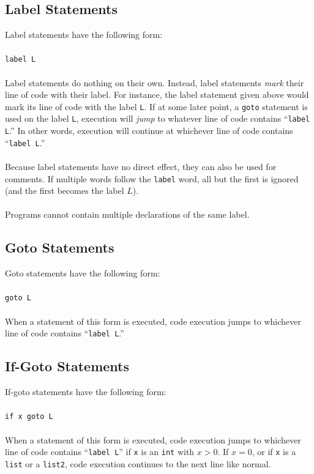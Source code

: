 \documentclass{report}
\begin{document}
\subsection{Label Statements}

Label statements have the following form: \\ \\ 
\texttt{label L} \\ \\
Label statements do nothing on their own. Instead, label statements \emph{mark} their line of code with their label. For instance, the label statement given above would mark its line of code with the label \texttt{L}. If at some later point, a \texttt{goto} statement is used on the label \texttt{L}, execution will \emph{jump} to whatever line of code contains ``\texttt{label L}.'' In other words, execution will continue at whichever line of code contains ``\texttt{label L}.'' \\ \\
Because label statements have no direct effect, they can also be used for comments. If multiple words follow the \texttt{label} word, all but the first is ignored (and the first becomes the label $L$). \\ \\
Programs cannot contain multiple declarations of the same label.

\subsection{Goto Statements}

Goto statements have the following form: \\ \\
\texttt{goto L} \\ \\ 
When a statement of this form is executed, code execution jumps to whichever line of code contains ``\texttt{label L}.''

\subsection{If-Goto Statements}

If-goto statements have the following form: \\ \\
\texttt{if x goto L} \\ \\ 
When a statement of this form is executed, code execution jumps to whichever line of code contains ``\texttt{label L}'' if \texttt{x} is an \texttt{int} with $x > 0$. If $x = 0$, or if \texttt{x} is a \texttt{list} or a \texttt{list2}, code execution continues to the next line like normal. \\
\end{document}
